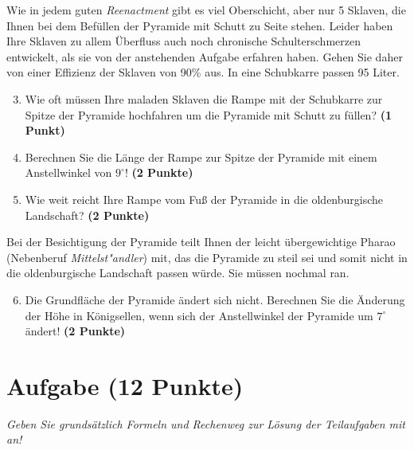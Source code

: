 \documentclass[a4paper, 9pt]{scrartcl}\usepackage[]{graphicx}\usepackage[]{xcolor}
\begin{document}
Wie in jedem guten \textit{Reenactment} gibt es viel Oberschicht, aber nur
5 Sklaven, die Ihnen bei dem Bef{\"u}llen der Pyramide mit Schutt
zu Seite stehen. Leider haben Ihre Sklaven zu allem {\"U}berfluss auch noch
chronische Schulterschmerzen entwickelt, als sie von der
anstehenden Aufgabe erfahren haben. Gehen Sie daher von einer Effizienz der
Sklaven von 90\% aus. In eine Schubkarre passen
95 Liter.

\begin{enumerate}
  \setcounter{enumi}{2}
\item Wie oft m{\"u}ssen Ihre maladen Sklaven die Rampe mit der Schubkarre
  zur Spitze der Pyramide hochfahren um die Pyramide mit Schutt zu f{\"u}llen? \textbf{(1 Punkt)}
\item Berechnen Sie die L{\"a}nge der Rampe zur Spitze der Pyramide mit einem
  Anstellwinkel von $9^\circ$! \textbf{(2 Punkte)}
\item Wie weit reicht Ihre Rampe vom Fu{\ss} der Pyramide in die oldenburgische
  Landschaft?  \textbf{(2 Punkte)}
\end{enumerate}

Bei der Besichtigung der Pyramide teilt Ihnen der leicht {\"u}bergewichtige
Pharao (Nebenberuf \textit{Mittelst{"a}ndler}) mit, das die Pyramide zu
steil sei und somit nicht in die oldenburgische Landschaft passen
w{\"u}rde. Sie m{\"u}ssen nochmal ran.

\begin{enumerate}
  \setcounter{enumi}{5}
\item Die Grundfl{\"a}che der Pyramide {\"a}ndert sich nicht. Berechnen Sie die
  {\"A}nderung der H{\"o}he in K{\"o}nigsellen, wenn sich der Anstellwinkel der
  Pyramide um $7^\circ$ {\"a}ndert!  \textbf{(2 Punkte)}
\end{enumerate}



\clearpage

\section{Aufgabe \hfill (12 Punkte)}

\textit{Geben Sie grunds{\"a}tzlich Formeln und Rechenweg zur L{\"o}sung der
  Teilaufgaben mit an!} \\[1Ex]
\end{document}
